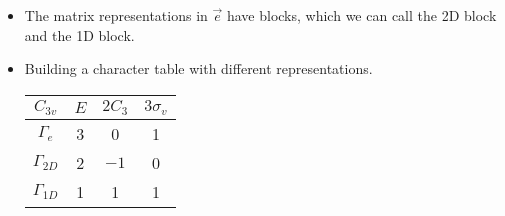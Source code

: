 \documentclass[../notes.tex]{subfiles}
\begin{document}
\begin{itemize}
\begin{align*}
        \sigma_a &=
        \begin{bmatrix}
            -1 & 0 & 0\\
            0 & 1 & 0\\
            0 & 0 & 1\\
        \end{bmatrix}&
            \sigma_b &=
            \begin{bNiceMatrix}
                \frac{1}{2} & -\frac{\sqrt{3}}{2} & 0\\
                -\frac{\sqrt{3}}{2} & -\frac{1}{2} & 0\\
                0 & 0 & 1\\
            \end{bNiceMatrix}&
                \sigma_c &=
                \begin{bNiceMatrix}
                    \frac{1}{2} & \frac{\sqrt{3}}{2} & 0\\
                    \frac{\sqrt{3}}{2} & -\frac{1}{2} & 0\\
                    0 & 0 & 1\\
                \end{bNiceMatrix}
    \end{align*}
    \begin{itemize}
        \item All of these are block-diagonal, so there must be some similarity transformation that gets us from the matrices in Table \ref{tab:NH3symmetryCharacters} to these matrices.
        \item Notice that the character is preserved under similarity transformation.
    \end{itemize}
    \item The matrix representations in $\vec{e}$ have blocks, which we can call the 2D block and the 1D block.
    \item Building a character table with different representations.
    \begin{table}[h!]
        \centering
        \small
        \renewcommand{\arraystretch}{1.2}
        \begin{tabular}{c|ccc}
            $C_{3v}$ & $E$ & $2C_3$ & $3\sigma_v$\\
            \hline
            $\Gamma_e$ & 3 & 0 & 1\\
            $\Gamma_{2D}$ & 2 & $-1$ & 0\\
            $\Gamma_{1D}$ & 1 & 1 & 1\\
        \end{tabular}

\end{table}
\end{itemize}
\end{document}
